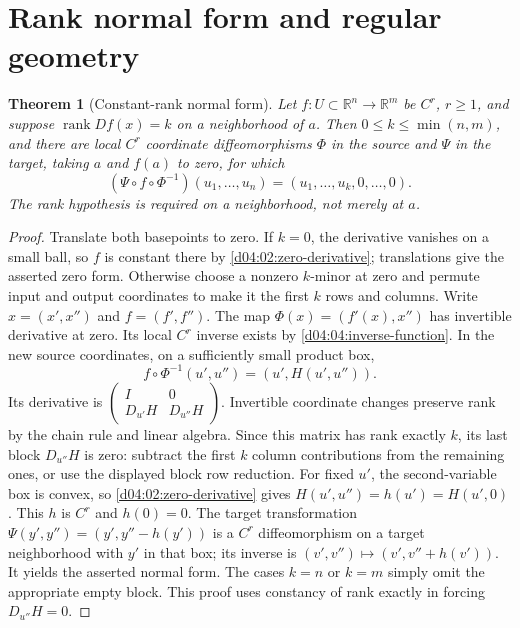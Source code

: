 \documentclass[11pt,oneside,openany]{book}
\newtheorem{theorem}{Theorem}[chapter]
\theoremstyle{definition}
\theoremstyle{remark}
\newcommand{\R}{\mathbb R}
\newcommand{\D}{\mathrm D}
\DeclareMathOperator{\rank}{rank}
\newcommand{\family}[1]{}
\begin{document}
\section{Rank normal form and regular geometry}
\family{K04.04.08}\family{K04.04.09}\family{K04.04.10}\family{K04.04.11}

\begin{theorem}[Constant-rank normal form]\label{d04:04:constant-rank}
Let $f:U\subset\R^n\to\R^m$ be $C^r$, $r\geq1$, and suppose
$\rank Df(x)=k$ on a neighborhood of $a$. Then $0\leq k\leq\min(n,m)$,
and there are local $C^r$ coordinate diffeomorphisms $\Phi$ in the source
and $\Psi$ in the target, taking $a$ and $f(a)$ to zero, for which
\[
 (\Psi\circ f\circ\Phi^{-1})(u_1,\ldots,u_n)
       =(u_1,\ldots,u_k,0,\ldots,0).
\]
The rank hypothesis is required on a neighborhood, not merely at $a$.
\end{theorem}
\begin{proof}
Translate both basepoints to zero. If $k=0$, the derivative vanishes on a
small ball, so $f$ is constant there by \cref{d04:02:zero-derivative};
translations give the asserted zero form. Otherwise choose a nonzero
$k$-minor at zero and permute input and output coordinates to make it the
first $k$ rows and columns. Write $x=(x',x'')$ and $f=(f',f'')$.
The map $\Phi(x)=(f'(x),x'')$ has invertible derivative at zero. Its local
$C^r$ inverse exists by \cref{d04:04:inverse-function}. In the new source
coordinates, on a sufficiently small product box,
\[
 f\circ\Phi^{-1}(u',u'')=(u',H(u',u'')).
\]
Its derivative is
$\left(\begin{smallmatrix}I&0\\D_{u'}H&D_{u''}H\end{smallmatrix}\right)$.
Invertible coordinate changes preserve rank by the chain rule and linear
algebra. Since this matrix has rank exactly $k$, its last block
$D_{u''}H$ is zero: subtract the first $k$ column contributions from the
remaining ones, or use the displayed block row reduction. For fixed $u'$,
the second-variable box is convex, so \cref{d04:02:zero-derivative} gives
$H(u',u'')=h(u')=H(u',0)$. This $h$ is $C^r$ and $h(0)=0$.
The target transformation
$\Psi(y',y'')=(y',y''-h(y'))$ is a $C^r$ diffeomorphism on a target
neighborhood with $y'$ in that box; its inverse is
$(v',v'')\mapsto(v',v''+h(v'))$. It yields the asserted normal form.
The cases $k=n$ or $k=m$ simply omit the appropriate empty block.
This proof uses constancy of rank exactly in forcing $D_{u''}H=0$.
\end{proof}
\end{document}
